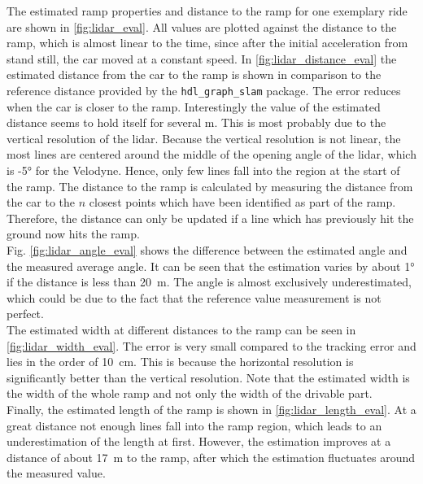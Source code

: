 The estimated ramp properties and distance to the ramp for one exemplary ride are shown in \cref{fig:lidar_eval}.
All values are plotted against the distance to the ramp, which is almost linear to the time, since after the initial acceleration from stand still, the car moved at a constant speed.
In \cref{fig:lidar_distance_eval} the estimated distance from the car to the ramp is shown in comparison to the reference distance provided by the \texttt{hdl\_graph\_slam} package.
The error reduces when the car is closer to the ramp.
Interestingly the value of the estimated distance seems to hold itself for several \si{\metre}.
This is most probably due to the vertical resolution of the \gls{lidar}.
Because the vertical resolution is not linear, the most lines are centered around the middle of the opening angle of the \gls{lidar}, which is -\ang{5} for the Velodyne.
Hence, only few lines fall into the region at the start of the ramp.
The distance to the ramp is calculated by measuring the distance from the car to the $n$ closest points which have been identified as part of the ramp.
Therefore, the distance can only be updated if a line which has previously hit the ground now hits the ramp.\\
Fig. \ref{fig:lidar_angle_eval} shows the difference between the estimated angle and the measured average angle.
It can be seen that the estimation varies by about \ang{1} if the distance is less than \SI{20}{\metre}.
The angle is almost exclusively underestimated, which could be due to the fact that the reference value measurement is not perfect.\\
The estimated width at different distances to the ramp can be seen in \cref{fig:lidar_width_eval}.
The error is very small compared to the tracking error and lies in the order of \SI{10}{\cm}.
This is because the horizontal resolution is significantly better than the vertical resolution.
Note that the estimated width is the width of the whole ramp and not only the width of the drivable part.\\
Finally, the estimated length of the ramp is shown in \cref{fig:lidar_length_eval}.
At a great distance not enough lines fall into the ramp region, which leads to an underestimation of the length at first.
However, the estimation improves at a distance of about \SI{17}{\metre} to the ramp, after which the estimation fluctuates around the measured value.
